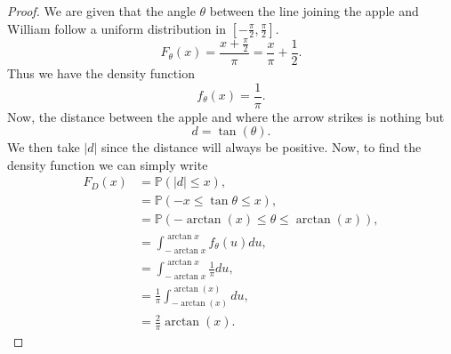 \documentclass{article}
\renewcommand{\P}[1]{\mathbb{P}(#1)}
\begin{document}
\begin{proof}
    We are given that the angle $\theta$ between the line joining the apple
    and William follow a uniform distribution in $[-\frac{\pi}{2}, \frac{\pi}{2}]$.
    \begin{equation*}
        F_\theta(x) = \frac{x + \frac{\pi}{2}}{\pi} = \frac{x}{\pi} + \frac{1}{2}.
    \end{equation*}
    Thus we have the density function
    \begin{equation*}
        f_\theta(x) = \frac{1}{\pi}.
    \end{equation*}
    Now, the distance between the apple and where the arrow strikes is nothing but
    \begin{equation*}
        d = \tan(\theta).
    \end{equation*}
    We then take $|d|$ since the distance will always be positive.
    Now, to find the density function we can simply write
    \begin{align*}
        F_D(x) & = \P{|d| \leq x},                                  \\
               & = \P{-x \leq \tan\theta \leq x},                   \\
               & = \P{-\arctan(x) \leq \theta \leq \arctan(x)},     \\
               & =\int_{-\arctan x}^{\arctan x} f_\theta(u) du,     \\
               & =\int_{-\arctan x}^{\arctan x} \frac{1}{\pi} du,   \\
               & = \frac{1}{\pi}\int^{\arctan(x)}_{-\arctan(x)} du, \\
               & = \frac{2}{\pi}\arctan(x).
    \end{align*}
\end{proof}
\end{document}
